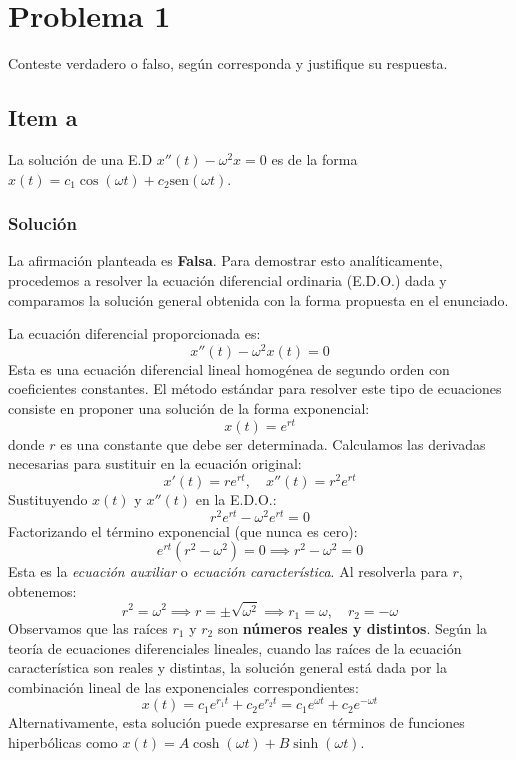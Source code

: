 \documentclass[a4paper]{article}
\begin{document}
\tableofcontents
\newpage

\section{Problema 1}
Conteste verdadero o falso, según corresponda y justifique su respuesta.

\subsection{Item a}
La solución de una E.D $x''(t) - \omega^2 x = 0$ es de la forma $x(t)= c_1 \cos(\omega t)+ c_2 \text{sen}(\omega t)$.

\subsubsection{Solución}
La afirmación planteada es \textbf{Falsa}. Para demostrar esto analíticamente, procedemos a resolver la ecuación diferencial ordinaria (E.D.O.) dada y comparamos la solución general obtenida con la forma propuesta en el enunciado.

La ecuación diferencial proporcionada es:
$$
x''(t) - \omega^2 x(t) = 0
$$
Esta es una ecuación diferencial lineal homogénea de segundo orden con coeficientes constantes. El método estándar para resolver este tipo de ecuaciones consiste en proponer una solución de la forma exponencial:
$$
x(t) = e^{rt}
$$
donde $r$ es una constante que debe ser determinada. Calculamos las derivadas necesarias para sustituir en la ecuación original:
$$
x'(t) = r e^{rt}, \quad x''(t) = r^2 e^{rt}
$$
Sustituyendo $x(t)$ y $x''(t)$ en la E.D.O.:
$$
r^2 e^{rt} - \omega^2 e^{rt} = 0
$$
Factorizando el término exponencial (que nunca es cero):
$$
e^{rt}(r^2 - \omega^2) = 0 \implies r^2 - \omega^2 = 0
$$
Esta es la \textit{ecuación auxiliar} o \textit{ecuación característica}. Al resolverla para $r$, obtenemos:
$$
r^2 = \omega^2 \implies r = \pm \sqrt{\omega^2} \implies r_1 = \omega, \quad r_2 = -\omega
$$
Observamos que las raíces $r_1$ y $r_2$ son \textbf{números reales y distintos}. Según la teoría de ecuaciones diferenciales lineales, cuando las raíces de la ecuación característica son reales y distintas, la solución general está dada por la combinación lineal de las exponenciales correspondientes:
$$
x(t) = c_1 e^{r_1 t} + c_2 e^{r_2 t} = c_1 e^{\omega t} + c_2 e^{-\omega t}
$$
Alternativamente, esta solución puede expresarse en términos de funciones hiperbólicas como $x(t) = A \cosh(\omega t) + B \sinh(\omega t)$.
\end{document}
